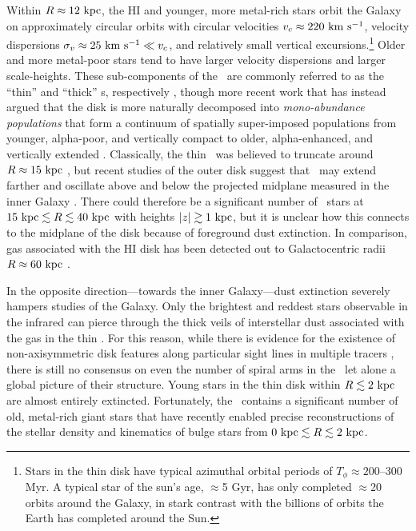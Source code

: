Within $R\approx 12~\mathrm{kpc}$, the HI and younger, more metal-rich stars orbit the
Galaxy on approximately circular orbits with circular velocities $v_c \approx
220~\mathrm{km}~\mathrm{s}^{-1}$, velocity dispersions $\sigma_v \approx 25~\mathrm{km}~\mathrm{s}^{-1} \ll v_c$, and
relatively small vertical excursions.\footnote{Stars in the thin disk have
typical azimuthal orbital periods of $T_\phi \approx 200$--300 Myr. A typical
star of the sun's age, $\approx$5 Gyr, has only completed $\approx$20 orbits
around the Galaxy, in stark contrast with the billions of orbits the Earth has
completed around the Sun.} Older and more metal-poor stars tend to have larger
velocity dispersions and larger scale-heights. These sub-components of the
\mwdisk\ are commonly referred to as the ``thin'' and ``thick'' \mwdisk s,
respectively \citep{gilmore83}, though more recent work that has instead argued
that the disk is more naturally decomposed into \emph{mono-abundance
populations} that form a continuum of spatially super-imposed populations from
younger, alpha-poor, and vertically compact to older, alpha-enhanced, and
vertically extended \citep[see, e.g., Figure~12 and Section~6 in][]{rixbovy13,
bovy12-nothickdisk}. Classically, the thin \mwdisk\ was believed to truncate
around $R \approx 15~\mathrm{kpc}$ \citep[e.g.,][]{robin92}, but recent studies of the
outer disk suggest that \mwdisk\ may extend farther and oscillate above and
below the projected midplane measured in the inner Galaxy \citep{xu15,
apw15-triand}. There could therefore be a significant number of \mwdisk\ stars
at $15~\mathrm{kpc} \lesssim R \lesssim 40~\mathrm{kpc}$ with heights $|z| \gtrsim 1~\mathrm{kpc}$, but
it is unclear how this connects to the midplane of the disk because of
foreground dust extinction. In comparison, gas associated with the HI disk has
been detected out to Galactocentric radii $R \approx 60~\mathrm{kpc}$
\citep{kalberla08}.

In the opposite direction---towards the inner Galaxy---dust extinction severely
hampers studies of the Galaxy. Only the brightest and reddest stars observable
in the infrared can pierce through the thick veils of interstellar dust
associated with the gas in the thin \mwdisk. For this reason, while there is
evidence for the existence of non-axisymmetric disk features along particular
sight lines in multiple tracers \citep[e.g.,][]{levine06, reid14}, there is
still no consensus on even the number of spiral arms in the \mwdisk\ let alone a
global picture of their structure. Young stars in the thin disk within $R
\lesssim 2~\mathrm{kpc}$ are almost entirely extincted. Fortunately, the \mwbulge\
contains a significant number of old, metal-rich giant stars that have recently
enabled precise reconstructions of the stellar density and kinematics of bulge
stars from $0~\mathrm{kpc} \lesssim R \lesssim 2~\mathrm{kpc}$.

